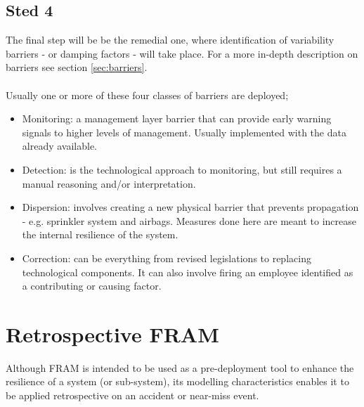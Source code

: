 \subsection*{Sted 4}
The final step will be be the remedial one, where identification of variability barriers - or damping factors - will take place. For a more in-depth description on barriers see section \ref{sec:barriers}.\\
\\
Usually one or more of these four classes of barriers are deployed;
\begin{itemize}
  \item Monitoring: a management layer barrier that can provide early warning signals to higher levels of management. Usually implemented with the data already available.
  \item Detection: is the technological approach to monitoring, but still requires a manual reasoning and/or interpretation.
  \item Dispersion: involves creating a new physical barrier that prevents propagation - e.g. sprinkler system and airbags. Measures done here are meant to increase the internal resilience of the system.
  \item Correction: can be everything from revised legislations to replacing technological components. It can also involve firing an employee identified as a contributing or causing factor.
\end{itemize}

\section{Retrospective FRAM}
Although FRAM is intended to be used as a pre-deployment tool to enhance the resilience of a system (or sub-system), its modelling characteristics enables it to be applied retrospective on an accident or near-miss event.\\
\\


